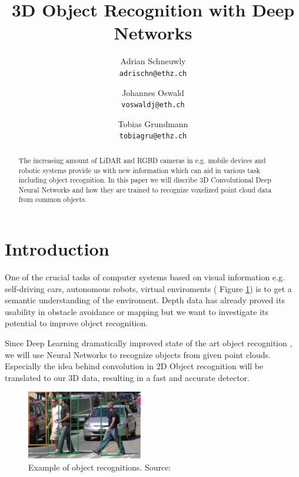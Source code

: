 \documentclass[10pt,twocolumn,letterpaper]{article}
\begin{document}
\title{3D Object Recognition with Deep Networks}

\author{Adrian Schneuwly\\
{\tt\small adrischn@ethz.ch}
\and
Johannes Oswald\\
{\tt\small voswaldj@eth.ch}
\and
Tobias Grundmann\\
{\tt\small tobiagru@ethz.ch}
}

\maketitle

\begin{abstract}
   The increasing amount of LiDAR and RGBD cameras in e.g. mobile devices
   and robotic systems provide us with new information which can aid in various task including object recognition. In this paper we will discribe 3D Convolutional Deep Neural Networks and  how they are trained to recognize voxelized point cloud data from common objects.
\end{abstract}

\section{Introduction}

One of the crucial tasks of computer systems based on visual information e.g. self-driving cars, autonomous robots, virtual enviroments ( Figure \ref{fig:obj_rec}) is to get a semantic understanding of the enviroment. Depth data has already proved its usability in obstacle avoidance or mapping but we want to investigate its potential to improve object recognition.


Since Deep Learning dramatically improved state of the art object recognition \cite{cnn}, we will use Neural Networks to recognize objects from given point clouds. Especially the idea behind convolution in 2D Object recognition will be translated to our 3D data, resulting in a fast and accurate detector. 

\begin{figure}[h]
	\label{fig:obj_rec}
	\centering
	\includegraphics[width=0.45\textwidth]{figures/obj_rec}
	\caption{Example of object recognitions. Source: \cite{udacity}}
\end{figure}
\end{document}
